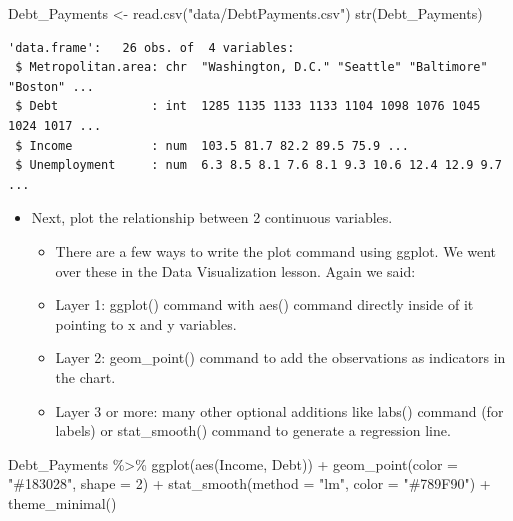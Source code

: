 \documentclass[
  letterpaper,
  DIV=11,
  numbers=noendperiod]{scrreprt}
\newenvironment{Shaded}{\begin{snugshade}}{\end{snugshade}}
\newcommand{\AttributeTok}[1]{\textcolor[rgb]{0.40,0.45,0.13}{#1}}
\newcommand{\DecValTok}[1]{\textcolor[rgb]{0.68,0.00,0.00}{#1}}
\newcommand{\FunctionTok}[1]{\textcolor[rgb]{0.28,0.35,0.67}{#1}}
\newcommand{\NormalTok}[1]{\textcolor[rgb]{0.00,0.23,0.31}{#1}}
\newcommand{\OtherTok}[1]{\textcolor[rgb]{0.00,0.23,0.31}{#1}}
\newcommand{\SpecialCharTok}[1]{\textcolor[rgb]{0.37,0.37,0.37}{#1}}
\newcommand{\StringTok}[1]{\textcolor[rgb]{0.13,0.47,0.30}{#1}}
\providecommand{\tightlist}{%
  \setlength{\itemsep}{0pt}\setlength{\parskip}{0pt}}\usepackage{longtable,booktabs,array}
\begin{document}
\begin{Shaded}
\begin{Highlighting}[]
\NormalTok{Debt\_Payments }\OtherTok{\textless{}{-}} \FunctionTok{read.csv}\NormalTok{(}\StringTok{"data/DebtPayments.csv"}\NormalTok{)}
\FunctionTok{str}\NormalTok{(Debt\_Payments)}
\end{Highlighting}
\end{Shaded}

\begin{verbatim}
'data.frame':   26 obs. of  4 variables:
 $ Metropolitan.area: chr  "Washington, D.C." "Seattle" "Baltimore" "Boston" ...
 $ Debt             : int  1285 1135 1133 1133 1104 1098 1076 1045 1024 1017 ...
 $ Income           : num  103.5 81.7 82.2 89.5 75.9 ...
 $ Unemployment     : num  6.3 8.5 8.1 7.6 8.1 9.3 10.6 12.4 12.9 9.7 ...
\end{verbatim}

\begin{itemize}
\tightlist
\item
  Next, plot the relationship between 2 continuous variables.

  \begin{itemize}
  \tightlist
  \item
    There are a few ways to write the plot command using ggplot. We went
    over these in the Data Visualization lesson. Again we said:
  \item
    Layer 1: ggplot() command with aes() command directly inside of it
    pointing to x and y variables.
  \item
    Layer 2: geom\_point() command to add the observations as indicators
    in the chart.
  \item
    Layer 3 or more: many other optional additions like labs() command
    (for labels) or stat\_smooth() command to generate a regression
    line.
  \end{itemize}
\end{itemize}

\begin{Shaded}
\begin{Highlighting}[]
\NormalTok{Debt\_Payments }\SpecialCharTok{\%\textgreater{}\%}
    \FunctionTok{ggplot}\NormalTok{(}\FunctionTok{aes}\NormalTok{(Income, Debt)) }\SpecialCharTok{+} \FunctionTok{geom\_point}\NormalTok{(}\AttributeTok{color =} \StringTok{"\#183028"}\NormalTok{, }\AttributeTok{shape =} \DecValTok{2}\NormalTok{) }\SpecialCharTok{+}
    \FunctionTok{stat\_smooth}\NormalTok{(}\AttributeTok{method =} \StringTok{"lm"}\NormalTok{, }\AttributeTok{color =} \StringTok{"\#789F90"}\NormalTok{) }\SpecialCharTok{+} \FunctionTok{theme\_minimal}\NormalTok{()}
\end{Highlighting}
\end{Shaded}
\end{document}
